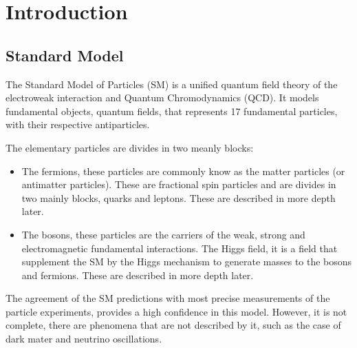 \chapter{Introduction}
\minitoc
\label{Cap:Int}
% 
\section{Standard Model}
\label{Cap:Int:SM}
The Standard Model of Particles (SM) is a unified quantum field theory of the electroweak interaction and Quantum Chromodynamics (QCD). It models fundamental objects, quantum fields, that represents 17 fundamental particles, with their respective antiparticles.

The elementary particles are divides in two meanly blocks: 
\begin{itemize}
    \item The fermions, these particles are commonly know as the matter particles (or antimatter particles). These are fractional spin particles and are divides in two mainly blocks, quarks and leptons. These are described in more depth later. 
    \item The bosons, these particles are the carriers of the weak, strong and electromagnetic fundamental interactions. The Higgs field, it is a field that supplement the SM by the Higgs mechanism to generate masses to the bosons and fermions. These are described in more depth later.
\end{itemize}

The agreement of the SM predictions with most precise measurements of the particle experiments, provides a high confidence in this model. However, it is not complete, there are phenomena that are not described by it, such as the case of dark mater and neutrino oscillations.

